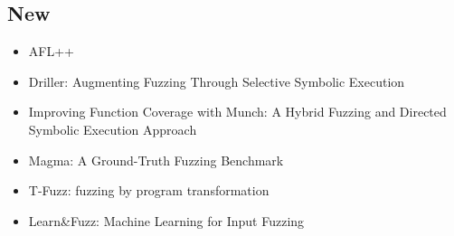 \documentclass[12pt]{article}
\begin{document}
\subsection{New}
\begin{itemize}
    \item AFL++\cite{AFLPlusPlus}
    \item Driller: Augmenting Fuzzing Through Selective Symbolic Execution\cite{Driller}
    \item Improving Function Coverage with Munch: A Hybrid Fuzzing and Directed Symbolic Execution Approach\cite{Munch}
    \item Magma: A Ground-Truth Fuzzing Benchmark\cite{Magma}
    \item T-Fuzz: fuzzing by program transformation\cite{TFuzz}
    \item Learn\&Fuzz: Machine Learning for Input Fuzzing\cite{LearnFuzz}
\end{itemize}



\end{document}
